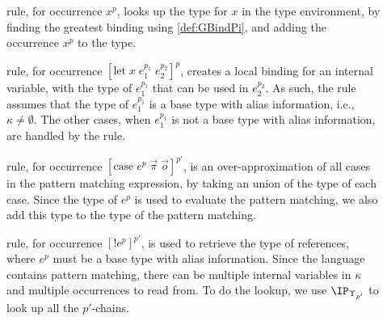 \documentclass{eptcs}
\begin{document}
\begin{description}

	\item[] rule, for occurrence $x^p$, looks up the type for $x$ in the type environment, by finding the greatest binding using \cref{def:GBindPi}, and adding the occurrence $x^p$ to the type.

	\item[] rule, for occurrence $[\mbox{let}\;x\;e_1^{p_1}\;e_2^{p_2}]^p$, creates a local binding for an internal variable, with the type of $e_1^{p_1}$ that can be used in $e_2^{p_2}$.
     As such, the rule assumes that the type of $e_1^{p_1}$ is a base type with alias information, i.e., $\kappa\neq\emptyset$.
		The other cases, when $e_1^{p_1}$ is not a base type with alias information, are handled by the  rule.

	\item[] rule, for occurrence $[\mbox{case}\;e^{p}\;\vec{\pi}\;\vec{o}]^{p'}$, is an over-approximation of all cases in the pattern matching expression, by taking an union of the type of each case.
		Since the type of $e^p$ is used to evaluate the pattern matching, we also add this type to the type of the pattern matching.

	\item[] rule, for occurrence $[!e^{p}]^{p'}$, is used to retrieve the type of references, where $e^p$ must be a base type with alias information.
     Since the language contains pattern matching, there can be multiple internal variables in $\kappa$ and multiple occurrences to read from.
     To do the lookup, we use $\IP_{\Upsilon_{p'}}$ to look up all the $p'$-chains.
\end{description}
\end{document}
